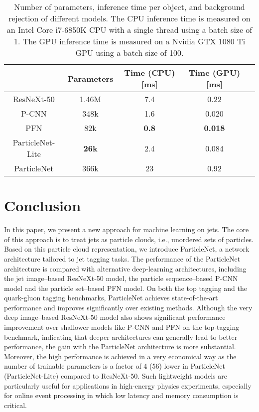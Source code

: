 \documentclass[aps,prd,longbibliography,reprint,amsmath,amssymb,amsfonts]{revtex4-1}
\begin{document}
\begin{table*}[htbp]
\centering
\caption{Number of parameters, inference time per object, and background rejection of different models. The CPU inference time is measured on an Intel Core i7-6850K CPU with a single thread using a batch size of 1. The GPU inference time is measured on a Nvidia GTX 1080 Ti GPU using a batch size of 100.}
\label{tab:model-size}
\begin{ruledtabular}
\begin{tabular}{ccccc}
                       & Parameters & Time (CPU) [ms] & Time (GPU) [ms] &  \\
    \hline
    ResNeXt-50         & 1.46M     & 7.4          & 0.22       &        \\
    P-CNN              & 348k      & 1.6          & 0.020      &         \\
    PFN                & 82k       & \bf 0.8      & \bf 0.018  &         \\
    ParticleNet-Lite   & \bf 26k   & 2.4          & 0.084      &        \\
    ParticleNet        & 366k      & 23           & 0.92       &    \\
\end{tabular}
\end{ruledtabular}
\end{table*}

 \section{Conclusion}
\label{sec:conclusion}


In this paper, we present a new approach for machine learning on jets. The core of this approach is to treat jets as particle clouds, i.e., unordered sets of particles. Based on this particle cloud representation, we introduce ParticleNet, a network architecture tailored to jet tagging tasks. The performance of the ParticleNet architecture is compared with alternative deep-learning architectures, including the jet image--based ResNeXt-50 model, the particle sequence--based P-CNN model and the particle set--based PFN model.  On both the top tagging and the quark-gluon tagging benchmarks, ParticleNet achieves state-of-the-art performance and improves significantly over existing methods. Although the very deep image--based ResNeXt-50 model also shows significant performance improvement over shallower models like P-CNN and PFN on the top-tagging benchmark, indicating that deeper architectures can generally lead to better performance, the gain with the ParticleNet architecture is more substantial. Moreover, the high performance is achieved in a very economical way as the number of trainable parameters is a factor of 4 (56) lower in ParticleNet (ParticleNet-Lite) compared to ResNeXt-50. Such lightweight models are particularly useful for applications in high-energy physics experiments, especially for online event processing in which low latency and memory consumption is critical. 
\end{document}
